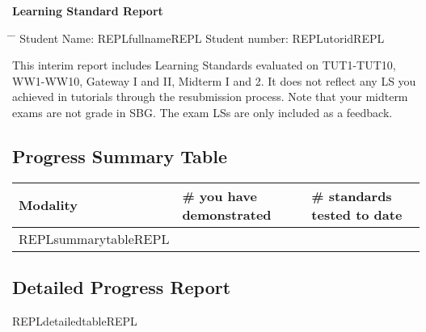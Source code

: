 
\setcounter{page}{1}
{\Large \centering \textbf{Learning Standard Report}}

\begin{tabbing}
    \hspace*{0em}\= \hspace*{12 cm} \= \kill
    \> Student Name: REPLfullnameREPL \>  Student number: REPLutoridREPL \\
\end{tabbing}

This interim report includes Learning Standards evaluated on TUT1-TUT10, WW1-WW10, Gateway I and II, Midterm I and 2. It does not reflect any LS you achieved in tutorials through the resubmission process. Note that your midterm exams are not grade in SBG. The exam LSs are only included as a feedback.

\subsection*{Progress Summary Table}
\begin{table}[!htbp]
    \centering
    \begin{tabularx}{\textwidth}{||X|l|l||}
        \toprule
        \textbf{Modality} & \textbf{\# you have demonstrated} & \textbf{\# standards tested to date} \\ \midrule \midrule
        REPLsummarytableREPL
        \bottomrule
    \end{tabularx}
\end{table}

\noindent
\subsection*{Detailed Progress Report}

        REPLdetailedtableREPL

\newpage
